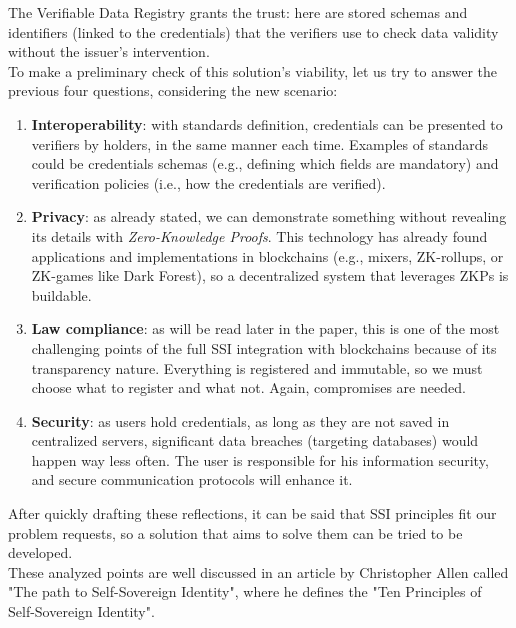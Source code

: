 The Verifiable Data Registry grants the trust: here are stored schemas and 
identifiers (linked to the credentials) that the verifiers use to check 
data validity without the issuer's intervention.
\vspace*{0.3cm}\\
To make a preliminary check of this solution's viability, let us try to 
answer the previous four questions, considering the new scenario:
\begin{enumerate}
    \item \textbf{Interoperability}: with standards definition, credentials
    can be presented to verifiers by holders, in the same manner each time. 
    Examples of standards could be credentials schemas (e.g., defining which fields are 
    mandatory) and verification policies (i.e., how the credentials are verified).
    \item \textbf{Privacy}: as already stated, we can demonstrate something
    without revealing its details with \textit{Zero-Knowledge Proofs}. This 
    technology has already found applications and implementations in 
    blockchains (e.g., mixers, ZK-rollups, or ZK-games like Dark Forest), 
    so a decentralized system that leverages ZKPs is buildable.
    \item \textbf{Law compliance}: as will be read later in the paper, 
    this is one of the most challenging points of the full SSI integration 
    with blockchains because of its transparency nature. Everything is 
    registered and immutable, so we must choose what to register and what 
    not. Again, compromises are needed.
    \item \textbf{Security}: as users hold credentials, as long as they are
    not saved in centralized servers, significant data breaches (targeting 
    databases) would happen way less often. The user is responsible for his 
    information security, and secure communication protocols will enhance it.
\end{enumerate}
After quickly drafting these reflections, it can be said that SSI 
principles fit our problem requests, so a solution that aims to solve them 
can be tried to be developed.\\
These analyzed points are well discussed in an article by Christopher Allen 
called "The path to Self-Sovereign Identity", where he defines the "Ten 
Principles of Self-Sovereign Identity".

